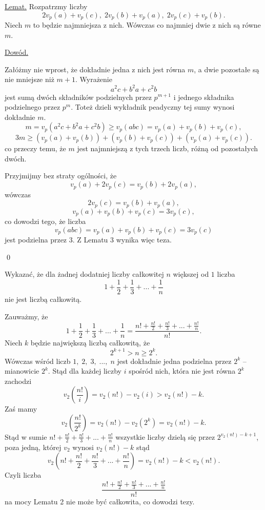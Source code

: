 \vspace{10px}


\noindent
\underline{Lemat.} Rozpatrzmy liczby
\[
	2v_p(a) + v_p(c),\; 2v_p(b) + v_p(a),\; 2v_p(c) + v_p(b).
\] 
Niech $m$ to będzie najmniejsza z nich. Wówczas co najmniej dwie z nich są równe $m$.


\vspace{5px}

\noindent
\underline{Dowód.}

\noindent
Załóżmy nie wprost, że dokładnie jedna z nich jest równa $m$, a dwie pozostałe są nie mniejsze niż $m + 1$. Wyrażenie
\[
	a^2c + b^2a + c^2b
\]
jest sumą dwóch składników podzielnych przez $p^{m + 1}$ i jednego składnika podzielnego przez $p^m$. Toteż dzieli wykładnik peadyczny tej sumy wynosi dokładnie $m$.
\[
	m = v_p(a^2c + b^2a + c^2b) \geqslant v_p(abc) = v_p(a) + v_p(b) + v_p(c),
\]
\[
	3m \geqslant (v_p(a) + v_p(b)) + (v_p(b) + v_p(c)) + (v_p(a)  + v_p(c)).
\]
co przeczy temu, że $m$ jest najmniejszą z tych trzech liczb, różną od pozostałych dwóch.

\vspace{15px}

\noindent
Przyjmijmy bez straty ogólności, że
\[
	v_p(a) + 2v_p(c) = v_p(b) + 2v_p(a),
\]
wówczas
\[
	2v_p(c) = v_p(b) + v_p(a),
\]
\[
	v_p(a) + v_p(b) + v_p(c) = 3v_p(c),
\]
co dowodzi tego, że liczba
\[
	v_p(abc) = v_p(a) + v_p(b) + v_p(c) = 3v_p(c)
\]
jest podzielna przez $3$. Z Lematu $3$ wynika więc teza. 

\qed

\vspace{10px}


\noindent
Wykazać, że dla żadnej dodatniej liczby całkowitej $n$ większej od $1$ liczba
\[
	1 + \frac{1}{2} + \frac{1}{3} + ... + \frac{1}{n}
\]
nie jest liczbą całkowitą.

\vspace{5px}


\noindent
Zauważmy, że
\[
	1 + \frac{1}{2} + \frac{1}{3} + ... + \frac{1}{n} = \frac{n! + \frac{n!}{2} + \frac{n!}{3} + ... + \frac{n!}{n}}{n!}.
\]
Niech $k$ będzie największą liczbą całkowitą, że
\[
	2^{k + 1} > n \geqslant 2^k.
\]
Wówczas wśród liczb $1,\; 2,\; 3,\; ..., \; n$ jest dokładnie jedna podzielna przez $2^{k}$ -- mianowicie $2^{k}$. Stąd dla każdej liczby $i$ spośród nich, która nie jest równa $2^k$ zachodzi
\[
	v_2\left(\frac{n!}{i}\right) = v_2(n!) - v_2(i) > v_2(n!) - k.
\]
Zaś mamy
\[
	v_2\left(\frac{n!}{2^k}\right) = v_2(n!) - v_2(2^k) = v_2(n!) - k.
\]
Stąd w sumie $n! + \frac{n!}{2} + \frac{n!}{3} + ... + \frac{n!}{n}$ wszystkie liczby dzielą się przez $2^{v_2(n!) - k + 1}$, poza jedną, której $v_2$ wynosi $v_2(n!) - k$ stąd
\[
	v_2\left(n! + \frac{n!}{2} + \frac{n!}{3} + ... + \frac{n!}{n}\right) = v_2(n!) - k < v_2(n!).
\]
Czyli liczba
\[
	\frac{n! + \frac{n!}{2} + \frac{n!}{3} + ... + \frac{n!}{n}}{n!}
\]
na mocy Lematu 2 nie może być całkowita, co dowodzi tezy.


